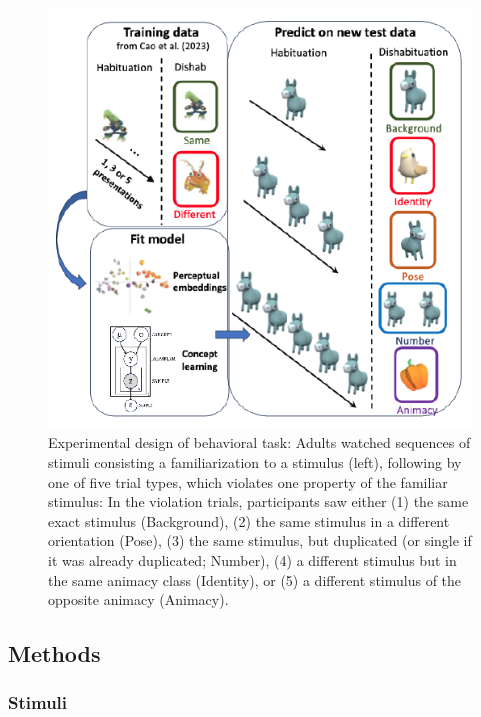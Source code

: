 \documentclass[10pt, letterpaper]{article}
\newenvironment{CodeChunk}{}{}
\begin{document}
\begin{CodeChunk}
\begin{figure}[H]

{\centering \includegraphics{figs/design_fig-1} 

}

\caption[Experimental design of behavioral task]{Experimental design of behavioral task: Adults watched sequences of stimuli consisting a familiarization to a stimulus (left), following by one of five trial types, which violates one property of the familiar stimulus: In the violation trials, participants saw either (1) the same exact stimulus (Background), (2) the same stimulus in a different orientation (Pose), (3) the same stimulus, but duplicated (or single if it was already duplicated; Number), (4) a different stimulus but in the same animacy class (Identity), or (5) a different stimulus of the opposite animacy (Animacy).}\label{fig:design_fig}
\end{figure}
\end{CodeChunk}

\hypertarget{methods}{%
\subsection{Methods}\label{methods}}

\hypertarget{stimuli}{%
\subsubsection{Stimuli}\label{stimuli}}
\end{document}
